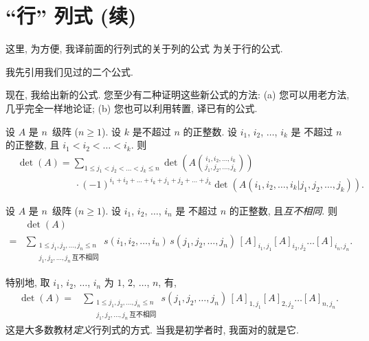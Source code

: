 \KunAsteriskoEnEnhavtabelo
\section{``行'' 列式 (续)}
\SenAsteriskoEnEnhavtabelo

\maldevigalegajxo

这里, 为方便,
我译前面的行列式的关于列的公式%
为关于行的公式.

我先引用我们见过的二个公式.

\TheoremExpansionAboutRowOne*

\TheoremExpansionAboutAnyRow*

现在, 我给出新的公式.
您至少有二种证明这些新公式的方法:
(a)
您可以用老方法, 几乎完全一样地论证;
(b)
您也可以利用转置, 译已有的公式.

\begin{theorem}
    设 \(A\) 是 \(n\)~级阵 (\(n \geq 1\)).
    设 \(k\) 是不超过 \(n\) 的正整数.
    设 \(i_1\), \(i_2\), \(\dots\), \(i_k\) 是%
    不超过 \(n\) 的正整数,
    且 \(i_1 < i_2 < \dots < i_k\).
    则
    \begin{align*}
         &
        \det {(A)}
        = \sum_{1 \leq j_1 < j_2 < \dots < j_k \leq n}
        {\det {\left(
                A\binom{i_1, i_2, \dots, i_k}
                {j_1, j_2, \dots, j_k}
                \right)}}
        \\
         &
        \qquad \qquad \qquad
        \cdot (-1)^{i_1 + i_2 + \dots + i_k
            + j_1 + j_2 + \dots + j_k}
        \det {(A({i_1,i_2,\dots,i_k}|{j_1,j_2,\dots,j_k}))}.
    \end{align*}
\end{theorem}

\begin{theorem}
    设 \(A\) 是 \(n\)~级阵 (\(n \geq 1\)).
    设 \(i_1\), \(i_2\), \(\dots\), \(i_n\) 是%
    不超过 \(n\) 的正整数,
    且\emph{互不相同}.
    则
    \begin{align*}
             & \det {(A)}                  \\
        = {} &
        \sum_{\substack{
        1 \leq j_1, j_2, \dots, j_n \leq n \\
                j_1, j_2, \dots, j_n\,\text{互不相同}
            }}
        {s(i_1, i_2, \dots, i_n)\,
            s(j_1, j_2, \dots, j_n)\,
            [A]_{i_1,j_1} [A]_{i_2,j_2} \dots [A]_{i_n,j_n}}.
    \end{align*}
\end{theorem}

特别地, 取
\(i_1\), \(i_2\), \(\dots\), \(i_n\)
为
\(1\), \(2\), \(\dots\), \(n\),
有,
\begin{align*}
    \det {(A)}
    = {} &
    \sum_{\substack{
    1 \leq j_1, j_2, \dots, j_n \leq n \\
            j_1, j_2, \dots, j_n\,\text{互不相同}
        }}
    { s(j_1, j_2, \dots, j_n)\,
        [A]_{1,j_1} [A]_{2,j_2} \dots [A]_{n,j_n}}.
\end{align*}
这是大多数教材\emph{定义}行列式的方式.
当我是初学者时, 我面对的就是它.

